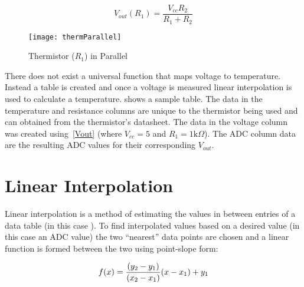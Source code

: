 \documentclass[main.tex]{subfiles}
\begin{document}
	\begin{equation}
		V_{out}(R_{1}) = \frac{V_{cc}R_{2}}{R_{1}+R_{2}}
		\label{eq:Vout}
	\end{equation}
	
	\begin{figure}[H]
		\begin{center}
			\texttt{[image: thermParallel]}
		\end{center}
		\caption{Thermistor ($R_{1}$) in Parallel}
		\label{fig:parallelThermistor}
	\end{figure}
	
	There does not exist a universal function that maps voltage to temperature.
	Instead a table is created and once a voltage is measured linear interpolation
	is used to calculate a temperature.  shows a sample table.
	The data in the temperature and resistance columns are unique to the
	thermistor being used and can obtained from the thermistor's datasheet. The
	data in the voltage column was created using~\eqref{Vout} (where $V_{cc} = 5$
	and $R_{1} = 1\mathrm{k}\Omega$). The ADC column data are the resulting ADC values
	for their corresponding $V_{out}$.

	\begin{table}[H]
		\begin{center}
		\end{center}
	\end{table}
	
	\section{Linear Interpolation}\label{sec:linearInterpolation}
	Linear interpolation is a method of estimating the values in between entries
	of a data table (in this case \tabref{sampleData}).  To find interpolated
	values based on a desired value (in this case an ADC value) the two
	``nearest'' data points are chosen and a linear function is formed between the
	two using point-slope form:

	\[
		f(x) = \frac{(y_{2}-y_{1})}{(x_{2}-x_{1})}(x-x_{1})+y_{1}\\
	\]
\end{document}
